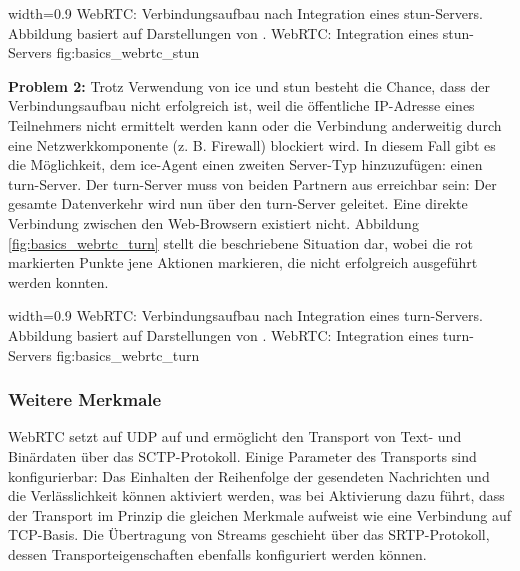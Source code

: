    {width=0.9\textwidth}
   {WebRTC: Verbindungsaufbau nach Integration eines \acrshort{stun}-Servers.
    Abbildung basiert auf Darstellungen von \cite{real-world-signalling}.}
   {WebRTC: Integration eines \acrshort{stun}-Servers}
   {fig:basics_webrtc_stun}

\textbf{Problem 2:}
Trotz Verwendung von \gls{ice} und \acrshort{stun} besteht die Chance, dass der
Verbindungsaufbau nicht erfolgreich ist, weil die öffentliche
IP-Adresse eines Teilnehmers nicht ermittelt werden kann oder die
Verbindung anderweitig durch eine Netzwerkkomponente (z. B. Firewall) blockiert wird. In diesem
Fall gibt es die Möglichkeit, dem \gls{ice}-Agent einen zweiten Server-Typ
hinzuzufügen: einen \acrshort{turn}-Server. Der \acrshort{turn}-Server muss von beiden
Partnern aus erreichbar sein: Der gesamte Datenverkehr wird nun über
den \acrshort{turn}-Server geleitet. Eine direkte Verbindung zwischen den
Web-Browsern existiert nicht. Abbildung \ref{fig:basics_webrtc_turn} stellt die beschriebene
Situation dar, wobei die rot markierten Punkte jene Aktionen markieren,
die nicht erfolgreich ausgeführt werden konnten.

   {width=0.9\textwidth}
   {WebRTC: Verbindungsaufbau nach Integration eines \acrshort{turn}-Servers.
    Abbildung basiert auf Darstellungen von \cite{real-world-signalling}.}
   {WebRTC: Integration eines \acrshort{turn}-Servers}
   {fig:basics_webrtc_turn}

\subsubsection*{Weitere Merkmale}\label{weitere-merkmale}

WebRTC setzt auf UDP auf und ermöglicht den Transport von Text-
und Binärdaten über das SCTP-Protokoll. Einige Parameter des Transports
sind konfigurierbar: Das Einhalten der Reihenfolge der gesendeten Nachrichten
und die Verlässlichkeit können aktiviert werden,
was bei Aktivierung dazu führt, dass der Transport im Prinzip die
gleichen Merkmale aufweist wie eine Verbindung auf TCP-Basis. Die
Übertragung von Streams geschieht über das SRTP-Protokoll, dessen
Transporteigenschaften ebenfalls konfiguriert werden können.

